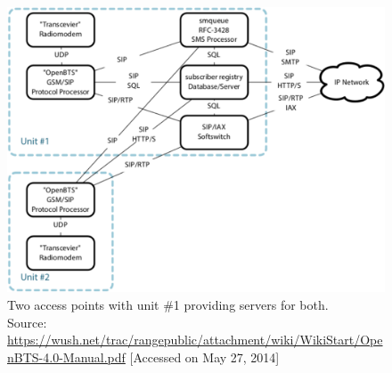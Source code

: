 \begin{figure}
  \centering
    \includegraphics[width=\textwidth]{btsLarge}
  \caption[OpenBTS network with two access points]{Two access points with unit 
  \#1 providing servers for both. \\
  \footnotesize{Source: \url{https://wush.net/trac/rangepublic/attachment/wiki/WikiStart/OpenBTS-4.0-Manual.pdf} [Accessed on May 27, 2014]}}
  \label{fig:btsLarge}
\end{figure}






